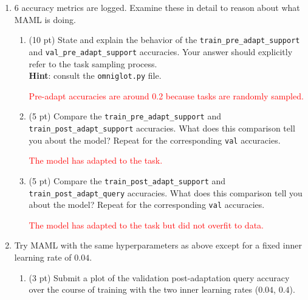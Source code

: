\documentclass[12pt]{article}
\begin{document}
\begin{enumerate}
\begin{enumerate}
        \end{enumerate}

        \newpage
        \item 6 accuracy metrics are logged. Examine these in detail to reason about what MAML is doing.
        \begin{enumerate}[label=(\alph*)]
            \item (10 pt) State and explain the behavior of the \texttt{train\_pre\_adapt\_support} and \texttt{val\_pre\_adapt\_support} accuracies. Your answer should explicitly refer to the task sampling process. \\ \textbf{Hint}: consult the \texttt{omniglot.py} file.

            \textcolor{red}{Pre-adapt accuracies are around 0.2 because tasks are randomly sampled.}


            \item (5 pt) Compare the \texttt{train\_pre\_adapt\_support} and \texttt{train\_post\_adapt\_support} accuracies. What does this comparison tell you about the model? Repeat for the corresponding \texttt{val} accuracies.

            \textcolor{red}{The model has adapted to the task.}

            \item (5 pt) Compare the \texttt{train\_post\_adapt\_support} and \texttt{train\_post\_adapt\_query} accuracies. What does this comparison tell you about the model? Repeat for the corresponding \texttt{val} accuracies.

            \textcolor{red}{The model has adapted to the task but did not overfit to data.}

        \end{enumerate}

        \newpage
        \item Try MAML with the same hyperparameters as above except for a fixed inner learning rate of $0.04$.
        \begin{enumerate}[label=(\alph*)]
            \item (3 pt) Submit a plot of the validation post-adaptation query accuracy over the course of training with the two inner learning rates ($0.04$, $0.4$).


\end{enumerate}
\end{enumerate}
\end{document}
